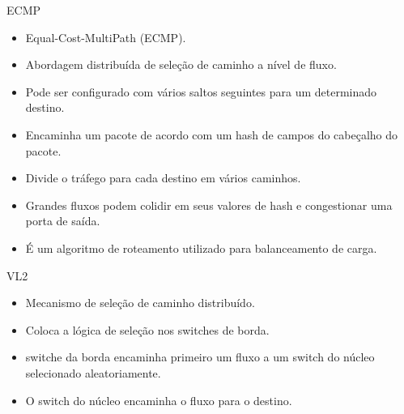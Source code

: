 \documentclass[aspectratio=169]{beamer}
\begin{document}
 
    \begin{frame} {ECMP}
      				
   
      \begin{itemize}
          \normalsize
          \item
   				
   				Equal-Cost-MultiPath (ECMP).
   					  
          \item
                Abordagem distribuída de seleção de caminho a nível de fluxo.
      
           \item
             Pode ser configurado com vários saltos seguintes para um determinado destino.
            
            \item
            	Encaminha um pacote de acordo com um
           		 hash de campos do cabeçalho do pacote.
      		\item
      			Divide o tráfego para cada destino em
      			vários caminhos.
      		\item
      			Grandes fluxos podem colidir em seus valores de hash e congestionar uma porta de saída.
      		\item
      			É um algoritmo de roteamento utilizado para balanceamento de carga.
                      
      \end{itemize}
               
	        
                
    \end{frame}     
    
    
    
 
    \begin{frame} {VL2}
      				
	
	     \begin{itemize}
	         \normalsize
	         \item
	     				
	     			Mecanismo de seleção de caminho distribuído.
	   					  
	         \item
	               Coloca a lógica de seleção nos switches de borda.
	           
	           \item
	              switche da borda encaminha primeiro um fluxo a um switch do núcleo selecionado aleatoriamente.
	        	\item
	        		O switch do núcleo encaminha o fluxo para o destino. 
	     \end{itemize}
	        
                
    \end{frame}     
    
\end{document}
